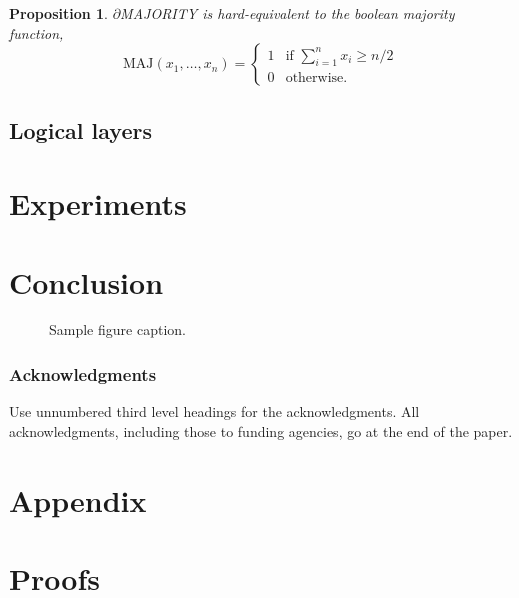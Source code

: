 \documentclass{article} %
\newtheorem{prop}{Proposition}
\begin{document}
\begin{prop}\label{prop:majority}
	$\partial${MAJORITY} is hard-equivalent to the boolean majority function,
\begin{equation*}
\text{MAJ}(x_{1}, \dots, x_{n}) = 
	\begin{cases}
	1 & \text{if } \sum_{i=1}^{n} x_{i} \geq n/2 \\
	0 & \text{otherwise.}
\end{cases}
\end{equation*}
\end{prop}


\subsection{Logical layers}



\section{Experiments}

\section{Conclusion}

\begin{figure}[h]
\begin{center}
\fbox{\rule[-.5cm]{0cm}{4cm} \rule[-.5cm]{4cm}{0cm}}
\end{center}
\caption{Sample figure caption.}
\end{figure}


\subsubsection*{Acknowledgments}
Use unnumbered third level headings for the acknowledgments. All
acknowledgments, including those to funding agencies, go at the end of the paper.





\appendix

\section*{Appendix}

\section{Proofs}
\end{document}
